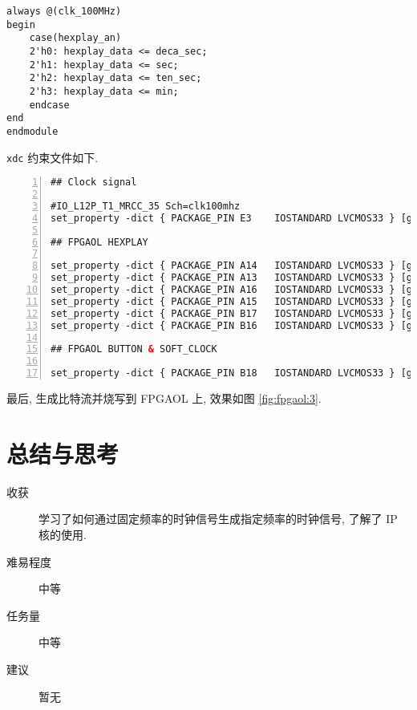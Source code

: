 \documentclass[UTF8,fontset=fandol]{ctexart}
\begin{document}
\begin{ExQuestions}
\begin{lstlisting}[style=verilogstyle, caption={计时器模块}]
always @(clk_100MHz)
begin
    case(hexplay_an)
    2'h0: hexplay_data <= deca_sec;
    2'h1: hexplay_data <= sec;
    2'h2: hexplay_data <= ten_sec;
    2'h3: hexplay_data <= min;
    endcase
end
endmodule
  \end{lstlisting}
  \texttt{xdc} 约束文件如下.
  \newpage
  \begin{lstlisting}[basicstyle=\footnotesize\ttfamily, numbers = left, language = XML, frame=lrtb, frameround=tttt, caption={xdc 约束文件}, breaklines=true]
## Clock signal

#IO_L12P_T1_MRCC_35 Sch=clk100mhz
set_property -dict { PACKAGE_PIN E3    IOSTANDARD LVCMOS33 } [get_ports { clk }]; 

## FPGAOL HEXPLAY

set_property -dict { PACKAGE_PIN A14   IOSTANDARD LVCMOS33 } [get_ports { hexplay_data[0] }];
set_property -dict { PACKAGE_PIN A13   IOSTANDARD LVCMOS33 } [get_ports { hexplay_data[1] }];
set_property -dict { PACKAGE_PIN A16   IOSTANDARD LVCMOS33 } [get_ports { hexplay_data[2] }];
set_property -dict { PACKAGE_PIN A15   IOSTANDARD LVCMOS33 } [get_ports { hexplay_data[3] }];
set_property -dict { PACKAGE_PIN B17   IOSTANDARD LVCMOS33 } [get_ports { hexplay_an[0] }];
set_property -dict { PACKAGE_PIN B16   IOSTANDARD LVCMOS33 } [get_ports { hexplay_an[1] }];

## FPGAOL BUTTON & SOFT_CLOCK

set_property -dict { PACKAGE_PIN B18   IOSTANDARD LVCMOS33 } [get_ports { rst }];
      \end{lstlisting}
      最后, 生成比特流并烧写到 FPGAOL 上, 效果如图 \ref{fig:fpgaol:3}.
\end{ExQuestions}
\section*{总结与思考}
    \begin{description}
      \item[收获] 学习了如何通过固定频率的时钟信号生成指定频率的时钟信号, 了解了 IP 核的使用.
      \item[难易程度] 中等
      \item[任务量] 中等
      \item[建议] 暂无
    \end{description}
\end{document}
